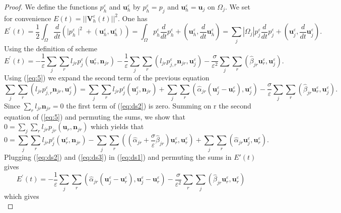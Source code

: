 \documentclass[a4paper,french,english,10pt]{article}
\newcommand\njr{\mathbf{n}_{jr}}
\newcommand\uu{\mathbf{u}}
\newcommand\eps{\varepsilon}
\newcommand\uj{\uu_j}
\newcommand\ur{\uu_r}
\newcommand\V{\mathbf{V}}
\begin{document}
\begin{proof}
We define the functions $p^{\eps}_h$ and $\uu^{\eps}_h$  by
$p^{\eps}_h=p_j$ and $\uu^{\eps}_h=\uj$  on $\Omega_j$.
We set for convenience $E(t)= \vert\vert \V^{\eps}_{h}(t)
\vert\vert^2$.
 One has
$$
E^{'}(t)=\displaystyle \frac12  \int_{\Omega} \frac{d}{dt}( \mid
p^{\eps}_{h} \mid^{2}+
(\uu^{\eps}_{h},\uu^{\eps}_{h}))=\int_{\Omega}
p^{\eps}_{h}\frac{d}{dt}p^{\eps}_{h}+(\uu^{\eps}_{h},\frac{d}{dt
}\uu^{\eps}_{h})
=\displaystyle \sum_{j} \left| \Omega_j \right|
p_{j}^{\eps}\frac{d}{dt} p_{j}^{\eps}+(\uj^{\eps},\frac{d}{dt}\uj^{\eps}).
$$
Using the definition of scheme 
\begin{equation}\label{eq:ds1}
\displaystyle E^{'}(t)=-\frac{1}{\varepsilon}
\sum_{j}\sum_{r}l_{jr}p_{j}^{\eps}(\ur^{\eps},\njr)
-\frac{1}{\varepsilon
}\sum_{j}\sum_{r}(l_{jr}p_{j,r}^{\eps} \njr,\uj^{\eps})
-\frac{\sigma}{\varepsilon^{2}}
\sum_{j}\sum_r (\widehat{\beta}_{jr}\ur^{\eps},\uj^{\eps}).
\end{equation}
Using (\ref{eq:5}) we expand the second term of the previous equation 
\begin{equation}\label{eq:ds2}
\displaystyle
\sum_{j}\sum_{r}(
l_{jr}p_{j,r}^{\eps}\njr
,\uj^{\eps})=\sum_{j}\sum_{r}l_{jr}p_{j}^{\eps}
(\uj^{\eps},\njr)+\sum_{j}\sum_{r}(\widehat {\alpha}_{jr}(\uj^{\eps}
-\ur^{\eps}),\uj^{\eps})-\frac{\sigma}{\varepsilon}\sum_{j}\sum_{r}({
\widehat\beta}_{jr}\ur^{\eps},\uj^{\eps}).
\end{equation}
Since $\sum_{r}l_{jr}\njr=0$ the first term of (\ref{eq:ds2}) is
zero.
Summing on r the second equation of (\ref{eq:5}) and permuting the sums, we show
that $0=
 \displaystyle \sum_{j}\sum_{r}l_{jr}p_{jr}(\ur,\njr)$ which yields that
\begin{equation}\label{eq:ds3}
0=
 \displaystyle \sum_{j}\sum_{r}l_{jr}p_{j}^{\eps}(\ur^{\eps},\njr)-
\sum_{j}\sum_{r}((\widehat
{\alpha}_{jr}+\frac{\sigma}{\varepsilon}\widehat
{\beta}_{jr})\ur^{\eps},\ur^{\eps})
+\sum_{j}\sum_{r}(\widehat{\alpha}_{jr}\uj^{\eps},\uu_{r
}^{\eps}).
\end{equation}
Plugging (\ref{eq:ds2}) and (\ref{eq:ds3}) in (\ref{eq:ds1}) and permuting the
sums in $E'(t)$ gives
\begin{equation*}\label{rresti}
E^{'}(t)=\displaystyle -\frac{1}{\varepsilon}
\sum_{j}\sum_{r}( \widehat{\alpha}_{jr}(\uj^{\eps}-\ur^{\eps}),\uj^{\eps}
-\ur^{\eps})- \frac{\sigma}{\varepsilon^{2}}
\sum_{r}\sum_{j}(\widehat {\beta}_{jr}\ur^{\eps},\ur^{\eps})
\end{equation*}
which gives
\begin{equation}\label{eq:ds4}

\end{equation}
\end{proof}
\end{document}
